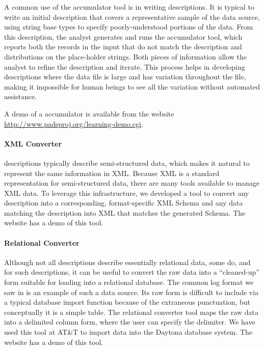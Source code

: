 \documentclass{sig-alternate}
\begin{document}
A common use of the accumulator tool is in writing \pads{}
descriptions.  It is typical to write an initial description that
covers a representative sample of the data source, using string base
types to specify poorly-understood portions of the data.  From this
description, the analyst generates and runs the accumulator tool,
which reports both the records in the input that do not match the
description and distributions on the place-holder strings.  Both
pieces of information allow the analyst to refine the description and
iterate.  This process helps in developing descriptions where the data
file is large and has variation throughout the file, making it
impossible for human beings to see all the variation without automated
assistance. 

A demo of a \pads{}  accumulator is available from the
website \url{http://www.padsproj.org/learning-demo.cgi}.

\paragraph{XML Converter} \pads{} descriptions typically describe
semi-structured data, which makes it natural to represent the same
information in XML.  Because XML is a standard representation for
semi-structured data, there are many tools available to manage XML
data.  To leverage this infrastructure, we developed a tool to convert
any \pads{} description into a corresponding, format-specific XML
Schema and any data matching the \pads{} description into XML that
matches the generated Schema. The \pads{} website has a demo of
this tool. 

\paragraph{Relational Converter} Although not all \pads{} descriptions
describe essentially relational data, some do, and for such
descriptions, it can be useful to convert the raw data into a
``cleaned-up'' form suitable for loading into a relational database.
The common log format we saw in  is an example of
such a data source.  Its raw form is difficult to include via a
typical database import function because of the extraneous
punctuation, but conceptually it is a simple table.  The \pads{}
relational converter tool maps the raw data into a delimited column
form, where the user can specify the delimiter.  We have used this
tool at AT\&T to import data into the Daytona database system. 
The \pads{} website has a demo of this tool. 
\end{document}
